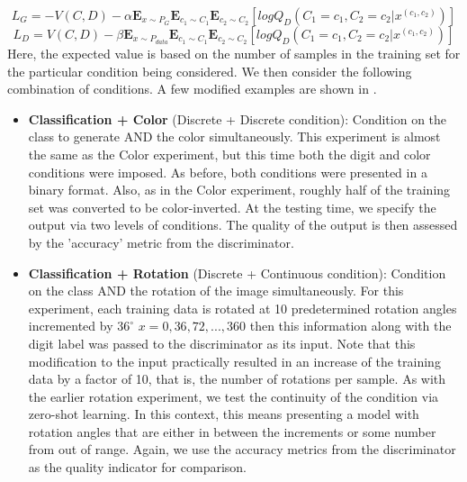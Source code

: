 \documentclass[11pt, letterpaper, oneside]{article}
\begin{document}
\begin{equation} 
L_G = -V(C, D) -\alpha \mathbf{E}_{x \sim P_G } \mathbf{E}_{c_1  \sim C_1}\mathbf{E}_{c_2  \sim C_2}[log Q_D(C_1 = c_1, C_2= c_2|x^{(c_1, c_2)})]
\end{equation}
\begin{equation}
L_D = V(C, D) -\beta \mathbf{E}_{x \sim P_{data} } \mathbf{E}_{c_1 \sim C_1}\mathbf{E}_{c_2  \sim C_2}[log Q_D(C_1 = c_1, C_2= c_2|x^{(c_1, c_2)})]
\end{equation}
Here, the expected value is based on the number of samples in the training set for the particular condition being considered.
We then consider the following combination of conditions. A few modified examples are shown in .
\begin{itemize}
    \item \textbf{Classification + Color} (Discrete + Discrete condition): Condition on the class to generate AND the color simultaneously. \newline
    This experiment is almost the same as the Color experiment, but this time both the digit and color conditions were imposed. As before, both conditions were presented in a binary format. Also, as in the Color experiment, roughly half of the training set was converted to be color-inverted. At the testing time, we specify the output via two levels of conditions. The quality of the output is then assessed by the 'accuracy' metric from the discriminator. 
    
    \item \textbf{Classification + Rotation} (Discrete + Continuous condition): Condition on the class AND the rotation of the image simultaneously. \newline
    For this experiment, each training data is rotated at 10 predetermined rotation angles incremented by $36^{\circ}$ $x={0, 36, 72, ..., 360}$ then this information along with the digit label was passed to the discriminator as its input. Note that this modification to the input practically resulted in an increase of the training data by a factor of 10, that is, the number of rotations per sample. As with the earlier rotation experiment, we test the continuity of the condition via zero-shot learning. In this context, this means presenting a model with rotation angles that are either in between the increments or some number from out of range. Again, we use the accuracy metrics from the discriminator as the quality indicator for comparison.
    

\end{itemize}
\end{document}
